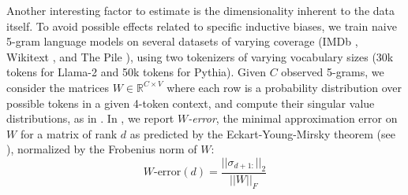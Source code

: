 Another interesting factor to estimate is the dimensionality inherent to the data itself. To avoid possible effects related to specific inductive biases, we train naive 5-gram language models on several datasets of varying coverage (IMDb \citep{imdb}, Wikitext \citep{wikitext}, and The Pile \citep{gao2020pile}), using two tokenizers of varying vocabulary sizes (30k tokens for Llama-2 and 50k tokens for Pythia). Given $C$ observed 5-grams, we consider the matrices $W \in \mathbb{R}^{C \times V}$ where each row is a probability distribution over possible tokens in a given 4-token context, and compute their singular value distributions, as in \citet{ngram_svd}. In , we report \textit{$W$\!-error}, the minimal approximation error on $W$ for a matrix of rank $d$ as predicted by the Eckart-Young-Mirsky theorem (see ), normalized by the Frobenius norm of $W$:
$$
W\text{-error}(d) = \frac{||\sigma_{d+1:}||_2}{||W||_F}
$$
